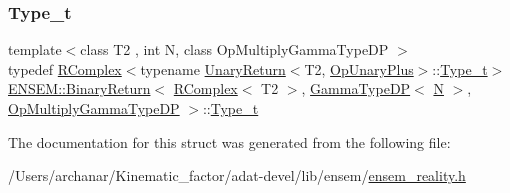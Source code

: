 \subsubsection{\texorpdfstring{Type\_t}{Type\_t}\hspace{0.1cm}{\footnotesize\ttfamily [3/3]}}
{\footnotesize\ttfamily template$<$class T2 , int N, class Op\+Multiply\+Gamma\+Type\+DP $>$ \\
typedef \mbox{\hyperlink{classENSEM_1_1RComplex}{R\+Complex}}$<$typename \mbox{\hyperlink{structENSEM_1_1UnaryReturn}{Unary\+Return}}$<$T2, \mbox{\hyperlink{structENSEM_1_1OpUnaryPlus}{Op\+Unary\+Plus}}$>$\+::\mbox{\hyperlink{structENSEM_1_1BinaryReturn_3_01RComplex_3_01T2_01_4_00_01GammaTypeDP_3_01N_01_4_00_01OpMultiplyGammaTypeDP_01_4_a03cefe5b95db43f31b7cad11f704178e}{Type\+\_\+t}}$>$ \mbox{\hyperlink{structENSEM_1_1BinaryReturn}{E\+N\+S\+E\+M\+::\+Binary\+Return}}$<$ \mbox{\hyperlink{classENSEM_1_1RComplex}{R\+Complex}}$<$ T2 $>$, \mbox{\hyperlink{classENSEM_1_1GammaTypeDP}{Gamma\+Type\+DP}}$<$ \mbox{\hyperlink{adat__devel_2lib_2hadron_2operator__name__util_8cc_a7722c8ecbb62d99aee7ce68b1752f337}{N}} $>$, \mbox{\hyperlink{structENSEM_1_1OpMultiplyGammaTypeDP}{Op\+Multiply\+Gamma\+Type\+DP}} $>$\+::\mbox{\hyperlink{structENSEM_1_1BinaryReturn_3_01RComplex_3_01T2_01_4_00_01GammaTypeDP_3_01N_01_4_00_01OpMultiplyGammaTypeDP_01_4_a03cefe5b95db43f31b7cad11f704178e}{Type\+\_\+t}}}



The documentation for this struct was generated from the following file\+:\begin{DoxyCompactItemize}
\item 
/\+Users/archanar/\+Kinematic\+\_\+factor/adat-\/devel/lib/ensem/\mbox{\hyperlink{adat-devel_2lib_2ensem_2ensem__reality_8h}{ensem\+\_\+reality.\+h}}\end{DoxyCompactItemize}
